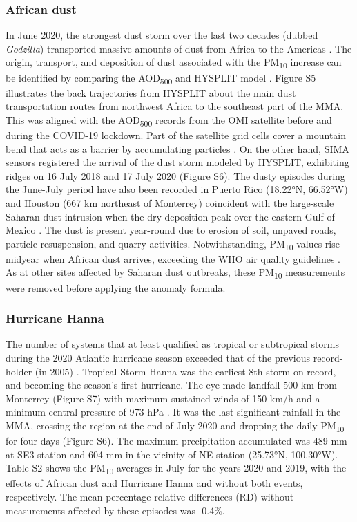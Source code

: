 \documentclass[sn-mathphys-num]{sn-jnl}
\begin{document}
\subsubsection{African dust}
In June 2020, the strongest dust storm over the last two decades (dubbed \textit{Godzilla}) transported massive amounts of dust from Africa to the Americas \citep{Francis_2020}. The origin, transport, and deposition of dust associated with the PM\textsubscript{10} increase can be identified by comparing the AOD\textsubscript{500} and HYSPLIT model \citep{Yassin_2018}. Figure S5 illustrates the back trajectories from HYSPLIT about the main dust transportation routes from northwest Africa to the southeast part of the MMA. This was aligned with the AOD\textsubscript{500} records from the OMI satellite before and during the COVID-19 lockdown. Part of the satellite grid cells cover a mountain bend that acts as a barrier by accumulating particles \citep{Gonz_lez_Santiago_2011,Martinez_2012}. On the other hand, SIMA sensors registered the arrival of the dust storm modeled by HYSPLIT, exhibiting ridges on 16 July 2018 and 17 July 2020 (Figure S6). The dusty episodes during the June-July period have also been recorded in Puerto Rico (18.22°N, 66.52°W) \citep{Euphrasie_Clotilde_2020} and Houston (667 km northeast of Monterrey) coincident with the large-scale Saharan dust intrusion \citep{Bozlaker_2013} when the dry deposition peak over the eastern Gulf of Mexico \citep{Lenes_2012}. The dust is present year-round due to erosion of soil, unpaved roads, particle resuspension, and quarry activities. Notwithstanding, PM\textsubscript{10} values rise midyear when African dust arrives, exceeding the WHO air quality guidelines \citep{Prospero_2014}. As at other sites affected by Saharan dust outbreaks, these PM\textsubscript{10} measurements were removed \citep{Clemente_2022} before applying the anomaly formula.
\subsubsection{Hurricane Hanna}
The number of systems that at least qualified as tropical or subtropical storms during the 2020 Atlantic hurricane season exceeded that of the previous record-holder (in 2005) \citep{stefano2021,Beven_2021}. Tropical Storm Hanna was the earliest 8th storm on record, and becoming the season's first hurricane. The eye made landfall 500 km from Monterrey (Figure S7) with maximum sustained winds of 150 km/h and a minimum central pressure of 973 hPa \citep{conagua}. It was the last significant rainfall in the MMA, crossing the region at the end of July 2020 and dropping the daily PM\textsubscript{10} for four days (Figure S6). The maximum precipitation accumulated was 489 mm at SE3 station and 604 mm in the vicinity of NE station (25.73°N, 100.30°W). Table S2 shows the PM\textsubscript{10} averages in July for the years 2020 and 2019, with the effects of African dust and Hurricane Hanna and without both events, respectively. The mean percentage relative differences (RD) without measurements affected by these episodes was -0.4\%.
\end{document}
